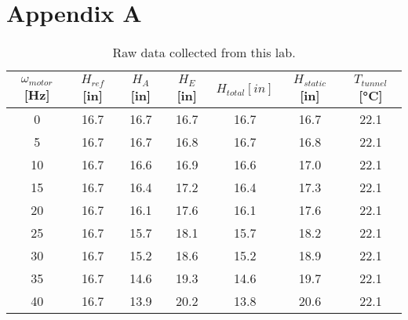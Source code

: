 \chapter{Appendix A}
\begin{table}[htpb]
    \caption{Raw data collected from this lab.}
    \label{tab:raw_data}
    \centering
    \begin{tabular}{ccccccc}
        \toprule
        $\omega_{motor}$ [\unit{\hertz}] & $H_{ref}$ [\unit{in}] & $H_A$ [\unit{in}] & $H_E$ [\unit{in}] & $H_{total} [\unit{in}]$ & $H_{static}$ [\unit{in}] & $T_{tunnel}$ [\unit{\degreeCelsius}] \\ 
        \midrule
        \num{0} & \num{16.7} & \num{16.7} & \num{16.7} & \num{16.7} & \num{16.7} & \num{22.1} \\
        \num{5} & \num{16.7} & \num{16.7} & \num{16.8} & \num{16.7} & \num{16.8} & \num{22.1} \\
        \num{10} & \num{16.7} & \num{16.6} & \num{16.9} & \num{16.6} & \num{17.0} & \num{22.1} \\
        \num{15} & \num{16.7} & \num{16.4} & \num{17.2} & \num{16.4} & \num{17.3} & \num{22.1} \\
        \num{20} & \num{16.7} & \num{16.1} & \num{17.6} & \num{16.1} & \num{17.6} & \num{22.1} \\
        \num{25} & \num{16.7} & \num{15.7} & \num{18.1} & \num{15.7} & \num{18.2} & \num{22.1} \\
        \num{30} & \num{16.7} & \num{15.2} & \num{18.6} & \num{15.2} & \num{18.9} & \num{22.1} \\
        \num{35} & \num{16.7} & \num{14.6} & \num{19.3} & \num{14.6} & \num{19.7} & \num{22.1} \\
        \num{40} & \num{16.7} & \num{13.9} & \num{20.2} & \num{13.8} & \num{20.6} & \num{22.1} \\
        \bottomrule
    \end{tabular}
\end{table}
